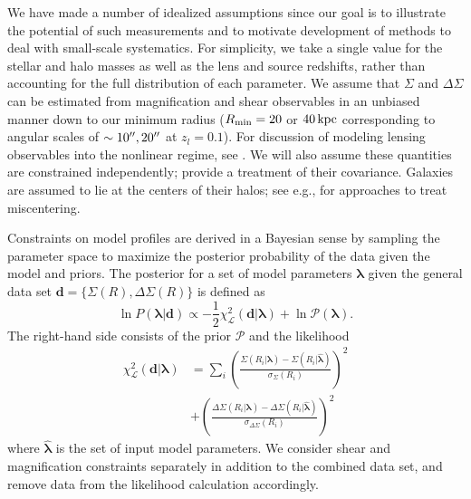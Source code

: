 \documentclass[12pt]{emulateapj}
\begin{document}
We have made a number of idealized assumptions since our goal is to
illustrate the potential of such measurements and to motivate
development of methods to deal with small-scale systematics. For
simplicity, we take a single value for the stellar and halo masses as well as
the lens and source redshifts, rather than accounting for the full
distribution of each parameter. We assume that $\Sigma$ and
$\Delta\Sigma$ can be estimated from magnification and shear
observables in an unbiased manner down to our minimum radius ($R_{\rm
  min} = 20$ or $40\,\rm{kpc}$ corresponding to angular scales of
$\sim10\mbox{$^{\prime\prime}$}, 20\mbox{$^{\prime\prime}$}$ at $z_l=0.1$). For discussion of modeling
lensing observables into the nonlinear regime, see \citet{Menard2003,
  Takada2003, Mandelbaum2006}. We will also assume these quantities
are constrained independently; \citet{Rozo2010} provide a treatment
of their covariance. Galaxies are assumed to lie at the centers of
their halos; see e.g., \citet{Johnston2007, George2012} for
approaches to treat miscentering.

Constraints on model profiles are derived in a Bayesian sense by
sampling the parameter space to maximize the posterior probability of
the data given the model and priors. The posterior for a set of model
parameters ${\bm \lambda}$ given the general data set ${\bm
  d}=\{\Sigma(R),\Delta\Sigma(R)\}$ is defined as 
\begin{equation}
\ln P({\bm \lambda}| {\bm d}) \propto
-\frac{1}{2}\chi^2_\mathcal{L}({\bm d}|{\bm \lambda}) + \ln{\mathcal P}({\bm \lambda}).
\end{equation}
The right-hand side consists of the prior ${\mathcal P}$ and the likelihood
\begin{equation}\begin{split}
\chi^2_{\mathcal L}({\bm d}|{\bm \lambda}) &=
\sum_{i}\left(\frac{\Sigma(R_i|{\bm \lambda}) -
      \Sigma(R_i|{\hat{\bm \lambda}})}{\sigma_{\Sigma}(R_i)}\right)^2 \\
&  + \left(\frac{\Delta\Sigma(R_i|{\bm \lambda}) -
      \Delta\Sigma(R_i|{\hat{\bm \lambda}})}{\sigma_{\Delta\Sigma}(R_i)}\right)^2
\end{split}\end{equation}
where $\hat{\bm \lambda}$ is the set of input model parameters. We
consider shear and magnification constraints separately in addition to
the combined data set, and remove data from the likelihood calculation
accordingly.
\end{document}
